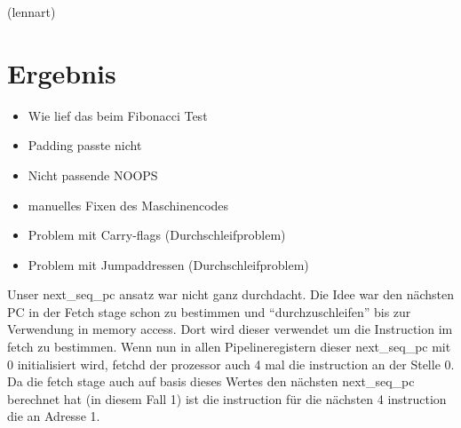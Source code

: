 \documentclass[paper=a4,fontsize=12pt,twocolumn]{scrreprt}
\begin{document}

(lennart)

\chapter{Ergebnis}




\begin{itemize}
    \item Wie lief das beim Fibonacci Test
    \item Padding passte nicht
    \item Nicht passende NOOPS
    \item manuelles Fixen des Maschinencodes
    \item Problem mit Carry-flags (Durchschleifproblem)
    \item Problem mit Jumpaddressen (Durchschleifproblem)
\end{itemize}

Unser next\_seq\_pc ansatz war nicht ganz durchdacht.
Die Idee war den nächsten PC in der Fetch stage schon zu bestimmen und \enquote{durchzuschleifen} bis zur Verwendung in memory access.
Dort wird dieser verwendet um die Instruction im fetch zu bestimmen.
Wenn nun in allen Pipelineregistern dieser next\_seq\_pc mit 0 initialisiert wird, fetchd der prozessor auch 4 mal die instruction an der Stelle 0.
Da die fetch stage auch auf basis dieses Wertes den nächsten next\_seq\_pc berechnet hat (in diesem Fall 1) ist die instruction für die nächsten 4 instruction die an Adresse 1.
\end{document}

